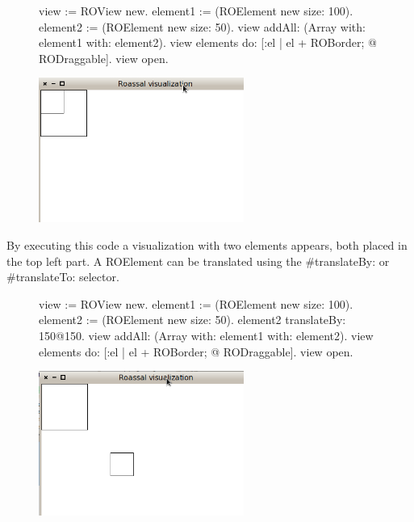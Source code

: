 \documentclass[a4paper,10pt,twoside]{book}
\begin{document}
\begin{figure}[H]
      \begin{minipage}[t]{0.5\textwidth}
      \vspace{0pt}
\begin{code}{}
view := ROView new.
element1 := (ROElement new size: 100).
element2 := (ROElement new size: 50).
view addAll: (Array with: element1 with: element2).
view elements do: [:el | el + ROBorder; @ RODraggable].
view open.
\end{code}
   \end{minipage}
   \hfill
   \begin{minipage}[t]{0.6\textwidth}
      \vspace{0pt} \raggedright
       \centering
		\includegraphics[width=0.6\textwidth]{ex3}
   \end{minipage}
\label{fig:ex3}
\end{figure}

By executing this code a visualization with two elements appears, both placed in the top left part. A ROElement can be translated using the \#translateBy: or \#translateTo: selector.

\begin{figure}[H]
      \begin{minipage}[t]{0.5\textwidth}
      \vspace{0pt}
\begin{code}{}
view := ROView new.
element1 := (ROElement new size: 100).
element2 := (ROElement new size: 50).
element2 translateBy: 150@150.
view addAll: (Array with: element1 with: element2).
view elements do: [:el | el + ROBorder; @ RODraggable].
view open.
\end{code}
   \end{minipage}
   \hfill
   \begin{minipage}[t]{0.6\textwidth}
      \vspace{0pt} \raggedright
       \centering
		\includegraphics[width=0.6\textwidth]{ex4}
   \end{minipage}
\label{fig:ex4}
\end{figure}
\end{document}
